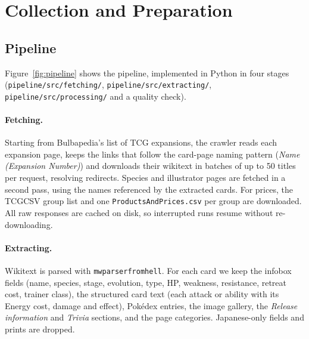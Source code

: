 \documentclass[sigconf]{acmart}
\begin{document}

  \section{Collection and Preparation}

  \subsection{Pipeline}

  Figure~\ref{fig:pipeline} shows the pipeline, implemented in Python in
  four stages (\texttt{pipeline/src/fetching/}, \texttt{pipeline/src/extracting/},
  \texttt{pipeline/src/processing/} and a quality check).

  \paragraph{Fetching.}
  Starting from Bulbapedia's list of TCG expansions, the crawler reads each
  expansion page, keeps the links that follow the card-page naming pattern
  (\textit{Name (Expansion Number)}) and downloads their wikitext in batches
  of up to 50 titles per request, resolving redirects. Species and illustrator
  pages are fetched in a second pass, using the names referenced by the
  extracted cards. For prices, the TCGCSV group list and one
  \texttt{ProductsAndPrices.csv} per group are downloaded. All raw responses
  are cached on disk, so interrupted runs resume without re-downloading.

  \paragraph{Extracting.}
  Wikitext is parsed with \texttt{mwparserfromhell}. For each card we keep
  the infobox fields (name, species, stage, evolution, type, HP, weakness,
  resistance, retreat cost, trainer class), the structured card text (each
  attack or ability with its Energy cost, damage and effect), Pok\'edex
  entries, the image gallery, the \emph{Release information} and
  \emph{Trivia} sections, and the page categories. Japanese-only fields and
  prints are dropped.
\end{document}
